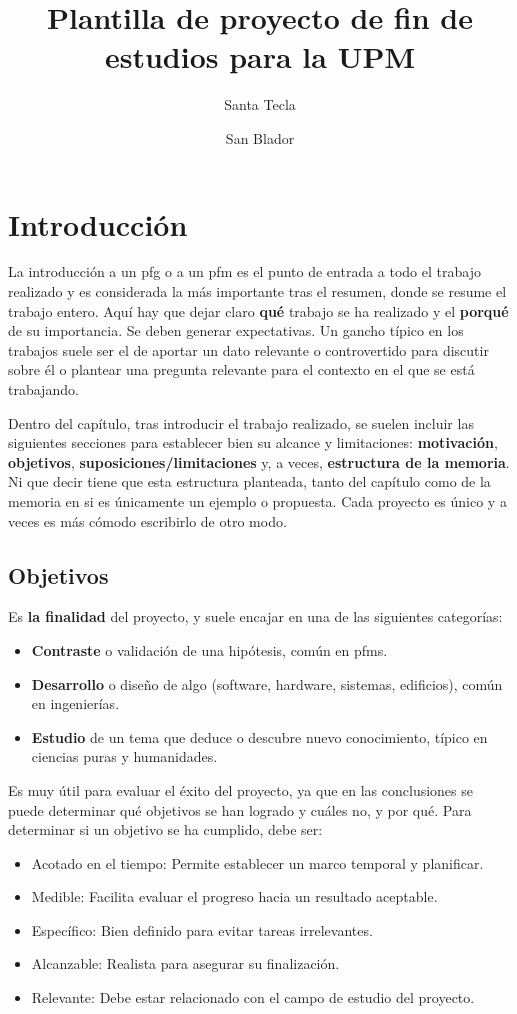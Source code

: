 \documentclass[%
    school=etsisi,%
    type=pfm,%
    degree=MAADM,%
]{upm-report}
\title{Plantilla de proyecto de fin de estudios para la UPM}
\author{Santa Tecla \and San Blador}
\begin{document}
\chapter{Introducción}
\label{ch:introduccion}

La introducción a un \gls{pfg} o a un \gls{pfm} es el punto de entrada a
todo el trabajo realizado y es considerada la más importante tras el
resumen, donde se resume el trabajo entero. Aquí hay que dejar claro
\textbf{qué} trabajo se ha realizado y el \textbf{porqué} de su
importancia. Se deben generar expectativas. Un gancho típico en los
trabajos suele ser el de aportar un dato relevante o controvertido para
discutir sobre él o plantear una pregunta relevante para el contexto en
el que se está trabajando.

Dentro del capítulo, tras introducir el trabajo realizado, se suelen
incluir las siguientes secciones para establecer bien su alcance y
limitaciones: \textbf{motivación}, \textbf{objetivos},
\textbf{suposiciones/limitaciones} y, a veces,
\textbf{estructura de la memoria}. Ni que decir tiene que esta
estructura planteada, tanto del capítulo como de la memoria en si es
únicamente un ejemplo o propuesta. Cada proyecto es único y a veces es
más cómodo escribirlo de otro modo.

\section{Objetivos}

Es \textbf{la finalidad} del proyecto, y suele encajar en una de las
siguientes categorías:

\begin{itemize}
    \item \textbf{Contraste} o validación de una hipótesis, común en
        \glspl{pfm}.
    \item \textbf{Desarrollo} o diseño de algo (software, hardware,
        sistemas, edificios), común en ingenierías.
    \item \textbf{Estudio} de un tema que deduce o descubre nuevo
        conocimiento, típico en ciencias puras y humanidades.
\end{itemize}

Es muy útil para evaluar el éxito del proyecto, ya que en las
conclusiones se puede determinar qué objetivos se han logrado y cuáles
no, y por qué. Para determinar si un objetivo se ha cumplido, debe ser:

\begin{itemize}
    \item Acotado en el tiempo: Permite establecer un marco temporal y
        planificar.
    \item Medible: Facilita evaluar el progreso hacia un resultado
        aceptable.
    \item Específico: Bien definido para evitar tareas irrelevantes.
    \item Alcanzable: Realista para asegurar su finalización.
    \item Relevante: Debe estar relacionado con el campo de estudio del
        proyecto.
\end{itemize}
\end{document}
